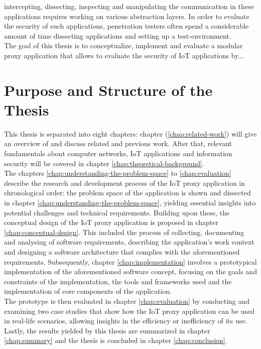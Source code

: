 intercepting, dissecting, inspecting and manipulating the communication in these applications requires working on various abstraction layers. In order to evaluate the security of such applications, penetration testers often spend a considerable amount of time dissecting applications and setting up a test-environment.\\
The goal of this thesis is to conceptualize, implement and evaluate a modular proxy application that allows to evaluate the security of \ac{IoT} applications by... %

\section{Purpose and Structure of the Thesis}
This thesis is separated into eight chapters: chapter (\ref{chap:related-work}) will give an overview of and discuss related and previous work. After that, relevant fundamentals about computer networks, \ac{IoT} applications and information security will be covered in chapter \ref{chap:theoretical-background}.\\
The chapters \ref{chap:understanding-the-problem-space} to \ref{chap:evaluation} describe the research and development process of the \ac{IoT} proxy application in chronological order: the problem space of the application is shown and dissected in chapter \ref{chap:understanding-the-problem-space}, yielding essential insights into potential challenges and technical requirements. Building upon these, the conceptual design of the \ac{IoT} proxy application is proposed in chapter \ref{chap:conceptual-design}. This included the process of collecting, documenting and analysing of software requirements, describing the application's work context and designing a software architecture that complies with the aforementioned requirements. Subsequently, chapter \ref{chap:implementation} involves a prototypical implementation of the aforementioned software concept, focusing on the goals and constraints of the implementation, the tools and frameworks used and the implementation of core components of the application.\\
The prototype is then evaluated in chapter \ref{chap:evaluation} by conducting and examining two case studies that show how the \ac{IoT} proxy application can be used in real-life scenarios, allowing insights in the efficiency or inefficiency of its use. Lastly, the results yielded by this thesis are summarized in chapter \ref{chap:summary} and the thesis is concluded in chapter \ref{chap:conclusion}. 

